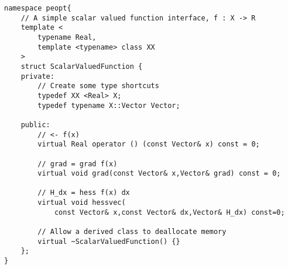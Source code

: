 \begin{lstlisting}[style=C++]
namespace peopt{
    // A simple scalar valued function interface, f : X -> R
    template <
        typename Real,
        template <typename> class XX
    >
    struct ScalarValuedFunction {
    private:
        // Create some type shortcuts
        typedef XX <Real> X;
        typedef typename X::Vector Vector;

    public:
        // <- f(x) 
        virtual Real operator () (const Vector& x) const = 0;

        // grad = grad f(x) 
        virtual void grad(const Vector& x,Vector& grad) const = 0;

        // H_dx = hess f(x) dx 
        virtual void hessvec(
            const Vector& x,const Vector& dx,Vector& H_dx) const=0;

        // Allow a derived class to deallocate memory
        virtual ~ScalarValuedFunction() {}
    };
}
\end{lstlisting}
